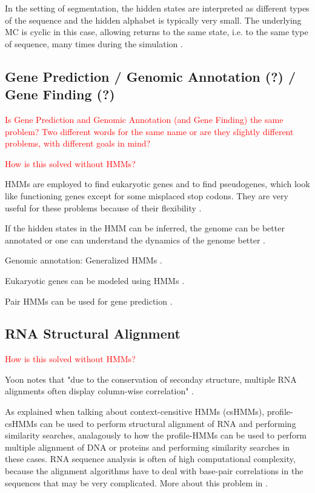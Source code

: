 \documentclass{article}\usepackage[]{graphicx}\usepackage[]{color}
\begin{document}
In the setting of segmentation, the hidden states are interpreted as different types of the sequence and the hidden alphabet is typically very small. The underlying MC is cyclic in this case, allowing returns to the same state, i.e. to the same type of sequence, many times during the simulation \cite{Christianini2006}. 

\subsection{Gene Prediction / Genomic Annotation (?) / Gene Finding (?)}
\textcolor{red}{Is Gene Prediction and Genomic Annotation (and Gene Finding) the same problem? Two different words for the same name or are they slightly different problems, with different goals in mind?}

\textcolor{red}{How is this solved without HMMs?}

HMMs are employed to find eukaryotic genes and to find pseudogenes, which look like functioning genes except for some misplaced stop codons. They are very useful for these problems because of their flexibility \cite{Christianini2006}.

If the hidden states in the HMM can be inferred, the genome can be better annotated or one can understand the dynamics of the genome better \cite{Christianini2006}.

Genomic annotation: Generalized HMMs \cite{Choo2004}.

Eukaryotic genes can be modeled using HMMs \cite{Yoon2009}. 

Pair HMMs can be used for gene prediction \cite{Yoon2009}.

\subsection{RNA Structural Alignment}\label{RNAStructuralAlignment}

\textcolor{red}{How is this solved without HMMs?}

Yoon notes that "due to the conservation of seconday structure, multiple RNA alignments often display column-wise correlation" \cite{Yoon2009}.

As explained when talking about context-censitive HMMs (csHMMs), profile-csHMMs can be used to perform structural alignment of RNA and performing similarity searches, analagously to how the profile-HMMs can be used to perform multiple alignment of DNA or proteins and performing similarity searches in these cases. RNA sequence analysis is often of high computational complexity, because the alignment algorithms have to deal with base-pair correlations in the sequences that may be very complicated. More about this problem in \cite{Yoon2009}.
\end{document}
